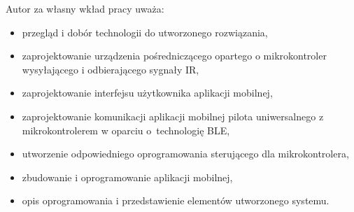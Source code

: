 \documentclass[12pt,twoside]{article}
\begin{document}
Autor za własny wkład pracy uważa: 
\begin{itemize}[label=-,labelsep=0.4cm,leftmargin=0.65cm]
   \item przegląd i dobór technologii do utworzonego rozwiązania,
   \item zaprojektowanie urządzenia pośredniczącego opartego o mikrokontroler wysyłającego i odbierającego sygnały IR,
   \item zaprojektowanie interfejsu użytkownika aplikacji mobilnej,
   \item zaprojektowanie komunikacji aplikacji mobilnej pilota uniwersalnego z mikrokontrolerem w oparciu o~technologię BLE,
   \item utworzenie odpowiedniego oprogramowania sterującego dla mikrokontrolera,
   \item zbudowanie i oprogramowanie aplikacji mobilnej,
   \item opis oprogramowania i przedstawienie elementów utworzonego systemu.
   
\end{itemize}

\clearpage
{}



\clearpage

\makesummary
\end{document}
